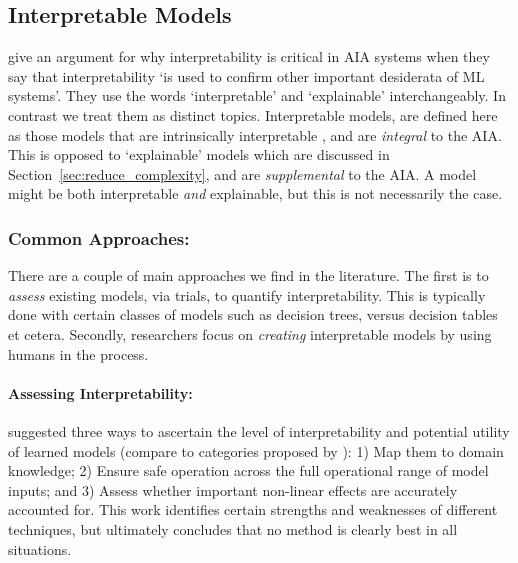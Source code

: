 \subsection{Interpretable Models} \label{sec:interp_models}
\citet{Doshi-Velez2017-xy} give an argument for why interpretability is critical in AIA systems when they say that interpretability `is used to confirm other important desiderata of ML systems'. They use the words `interpretable' and `explainable' interchangeably. In contrast we treat them as distinct topics. Interpretable models, are defined here as those models that are intrinsically interpretable , and are \emph{integral} to the AIA. This is opposed to `explainable' models which are discussed in Section~\ref{sec:reduce_complexity}, and are \emph{supplemental} to the AIA. A model might be both interpretable \emph{and} explainable, but this is not necessarily the case.

\subsubsection{Common Approaches:}
There are a couple of main approaches we find in the literature. The first is to \emph{assess} existing models, via trials, to quantify interpretability. This is typically done with certain classes of models such as decision trees, versus decision tables et cetera. Secondly, researchers focus on \emph{creating} interpretable models by using humans in the process.

\paragraph{Assessing Interpretability:}
\citet{Van_Belle2013-ph} suggested three ways to ascertain the level of interpretability and potential utility of learned models (compare to categories proposed by \citet{Lipton2016-ug}): 1) Map them to domain knowledge; 2) Ensure safe operation across the full operational range of model inputs; and 3) Assess whether important non-linear effects are accurately accounted for. This work identifies certain strengths and weaknesses of different techniques, but ultimately concludes that no method is clearly best in all situations.

